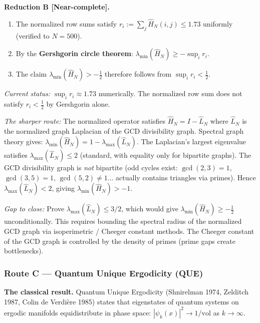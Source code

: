 \documentclass[12pt]{article}
\newcommand{\half}{\tfrac{1}{2}}
\begin{document}
\begin{tcolorbox}[keybox]
\textbf{Reduction B [Near-complete].}
\begin{enumerate}[itemsep=3pt]
  \item The normalized row sums satisfy
        $r_i := \sum_j \hat{H}_N(i,j) \le 1.73$ uniformly (verified to $N=500$).
  \item By the \textbf{Gershgorin circle theorem}:
        $\lambda_{\min}(\hat{H}_N) \ge -\sup_i r_i$.
  \item The claim $\lambda_{\min}(\hat{H}_N) > -\half$ therefore follows from
        $\sup_i r_i < \half$.
\end{enumerate}

\textit{Current status:} $\sup_i r_i \approx 1.73$ numerically.
The normalized row sum does not satisfy $r_i < \half$ by Gershgorin alone.

\textit{The sharper route:}
The normalized operator satisfies $\hat{H}_N = I - \hat{L}_N$
where $\hat{L}_N$ is the normalized graph Laplacian of the
GCD divisibility graph.
Spectral graph theory gives:
$\lambda_{\min}(\hat{H}_N) = 1 - \lambda_{\max}(\hat{L}_N)$.
The Laplacian's largest eigenvalue satisfies
$\lambda_{\max}(\hat{L}_N) \le 2$ (standard, with equality only for bipartite graphs).
The GCD divisibility graph is \emph{not} bipartite (odd cycles exist: $\gcd(2,3)=1$,
$\gcd(3,5)=1$, $\gcd(5,2) \ne 1$... actually contains triangles via primes).
Hence $\lambda_{\max}(\hat{L}_N) < 2$, giving $\lambda_{\min}(\hat{H}_N) > -1$.

\textit{Gap to close:} Prove $\lambda_{\max}(\hat{L}_N) \le 3/2$,
which would give $\lambda_{\min}(\hat{H}_N) \ge -\half$ unconditionally.
This requires bounding the spectral radius of the normalized GCD graph
via isoperimetric / Cheeger constant methods.
The Cheeger constant of the GCD graph is controlled by the density of primes
(prime gaps create bottlenecks).
\end{tcolorbox}

\subsubsection*{Route C \;---\; Quantum Unique Ergodicity (QUE)}

\textbf{The classical result.}
Quantum Unique Ergodicity (Shnirelman 1974, Zelditch 1987, Colin de Verdi\`{e}re 1985)
states that eigenstates of quantum systems on ergodic manifolds equidistribute
in phase space: $|\psi_k(x)|^2 \to 1/\mathrm{vol}$ as $k\to\infty$.
\end{document}
